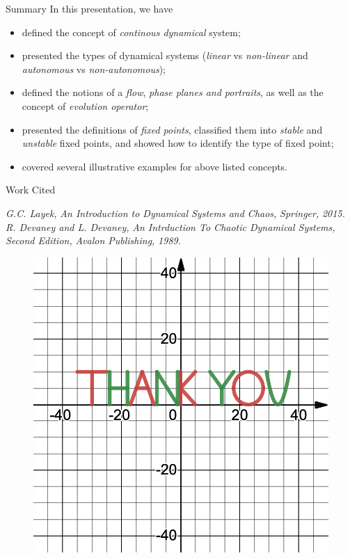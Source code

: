 \documentclass[18pt]{beamer}
\begin{document}
\begin{frame}{Summary}
    In this presentation, we have 
    \begin{itemize}
        \item defined the concept of \textit{continous dynamical} system;
        \pause{}
    \item presented the types of dynamical systems (\textit{linear} vs \textit{non-linear} and \textit{autonomous} vs \textit{non-autonomous});
        \pause{}
    \item defined the notions of a \textit{flow}, \textit{phase planes and portraits}, as well as the concept of \textit{evolution operator};
        \pause{}
    \item presented the definitions of \textit{fixed points}, classified them into \textit{stable} and \textit{unstable} fixed points, and showed how to identify the type of fixed point;
        \pause{}
        \item covered several illustrative examples for above listed concepts.
    \end{itemize}
\end{frame}

\begin{frame}{Work Cited}
    \begin{thebibliography}{1}
            \emph{G.C. Layek,}
            \emph{An Introduction to Dynamical Systems and Chaos,}
            \emph{Springer,}
            \emph{2015.}
                \emph{R. Devaney and L. Devaney,}
                \emph{An Intrduction To Chaotic Dynamical Systems,}
                \emph{Second Edition,}
                \emph{Avalon Publishing,}
                \emph{1989.}
    \end{thebibliography} 
\end{frame}

\begin{frame}
    \thispagestyle{empty}
    \begin{figure}[t]
        \centering
        \includegraphics[width=1\textwidth]{thankyou}
    \end{figure}
\end{frame}
\end{document}
